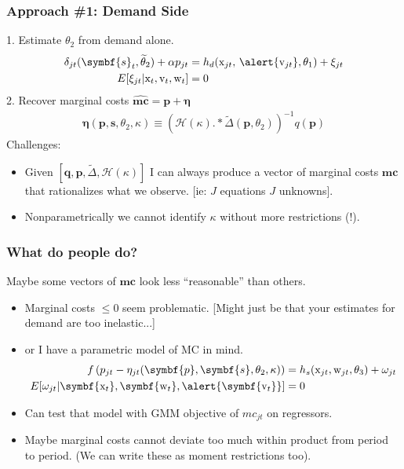\documentclass[aspectratio=169,10pt]{beamer}
\begin{document}
\begin{frame}
\frametitle{Approach \#1: Demand Side}
1. Estimate $\theta_2$ from demand alone.
\begin{align*}
\delta_{jt}(\symbf{s}_t,\widetilde{\theta}_2) + \alpha p_{jt} &= h_d(\textrm{x}_{jt}, \, \alert{\textrm{v}_{jt}},\theta_1)  + \xi_{jt} \\
E[\xi_{jt} | \textrm{x}_{t}, \textrm{v}_{t}, \textrm{w}_{t}] &=0
\end{align*}
2. Recover marginal costs $\widehat{\symbf{mc}} = \symbf{p} + \symbf{\eta}$
\begin{align*}
\symbf{\eta}(\symbf{p},\symbf{s},\theta_2,\kappa) \equiv \left(\mathcal{H}(\kappa).*\tilde{\Delta}(\symbf{p},\theta_2) \right)^{-1} q(\symbf{p})
\end{align*}
\vspace{-0.2cm}
Challenges:
\begin{itemize}
\item Given $[\symbf{q},\symbf{p},\tilde{\Delta},\mathcal{H}(\kappa)]$ I can always produce a vector of marginal costs $\symbf{mc}$ that rationalizes what we observe. [ie: $J$ equations $J$ unknowns].
\item Nonparametrically we cannot identify $\kappa$ without more restrictions (!).
\end{itemize}
\end{frame}



\begin{frame}\frametitle{What do people do?}
Maybe some vectors of $\symbf{mc}$ look less ``reasonable'' than others.
\begin{itemize}
\item Marginal costs $\leq 0$ seem problematic.
[Might just be that your estimates for demand are too inelastic...]
\item or I have a parametric model of MC in mind. 
\begin{align*}
 f \left( p_{jt} - \eta_{jt}(\symbf{p},\symbf{s},\theta_2,\kappa) \right) &= h_s(\textrm{x}_{jt}, \textrm{w}_{jt},\theta_3) + \omega_{jt}\\
 E[\omega_{jt} | \symbf{\textrm{x}_{t}}, \symbf{\textrm{w}_{t}}, \alert{\symbf{\textrm{v}_{t}}}]&=0
\end{align*}
\item Can test that model with GMM objective of $mc_{jt}$ on regressors.
\item Maybe marginal costs cannot deviate too much within product from period to period. (We can write these as moment restrictions too).
\end{itemize}
\end{frame}
\end{document}
